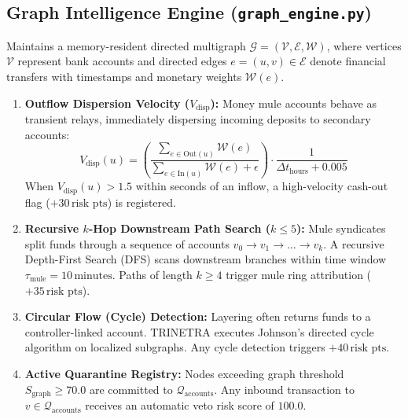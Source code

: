 \documentclass[11pt,a4paper]{article}
\begin{document}
\subsection{Graph Intelligence Engine (\texttt{graph\_engine.py})}
Maintains a memory-resident directed multigraph $\mathcal{G} = (\mathcal{V}, \mathcal{E}, \mathcal{W})$, where vertices $\mathcal{V}$ represent bank accounts and directed edges $e = (u, v) \in \mathcal{E}$ denote financial transfers with timestamps and monetary weights $\mathcal{W}(e)$.
\begin{enumerate}[leftmargin=1.8em, itemsep=3pt]
    \item \textbf{Outflow Dispersion Velocity ($V_{\text{disp}}$):}
    Money mule accounts behave as transient relays, immediately dispersing incoming deposits to secondary accounts:
    \begin{equation}
        V_{\text{disp}}(u) = \left( \frac{\sum_{e \in \text{Out}(u)} \mathcal{W}(e)}{\sum_{e \in \text{In}(u)} \mathcal{W}(e) + \epsilon} \right) \cdot \frac{1}{\Delta t_{\text{hours}} + 0.005}
    \end{equation}
    When $V_{\text{disp}}(u) > 1.5$ within seconds of an inflow, a high-velocity cash-out flag ($+30\,\text{risk pts}$) is registered.

    \item \textbf{Recursive $k$-Hop Downstream Path Search ($k \le 5$):}
    Mule syndicates split funds through a sequence of accounts $v_0 \to v_1 \to \dots \to v_k$. A recursive Depth-First Search (DFS) scans downstream branches within time window $\tau_{\text{mule}} = 10\,\text{minutes}$. Paths of length $k \ge 4$ trigger mule ring attribution ($+35\,\text{risk pts}$).

    \item \textbf{Circular Flow (Cycle) Detection:}
    Layering often returns funds to a controller-linked account. TRINETRA executes Johnson's directed cycle algorithm on localized subgraphs. Any cycle detection triggers $+40\,\text{risk pts}$.

    \item \textbf{Active Quarantine Registry:}
    Nodes exceeding graph threshold $S_{\text{graph}} \ge 70.0$ are committed to $\mathcal{Q}_{\text{accounts}}$. Any inbound transaction to $v \in \mathcal{Q}_{\text{accounts}}$ receives an automatic veto risk score of $100.0$.
\end{enumerate}
\end{document}

